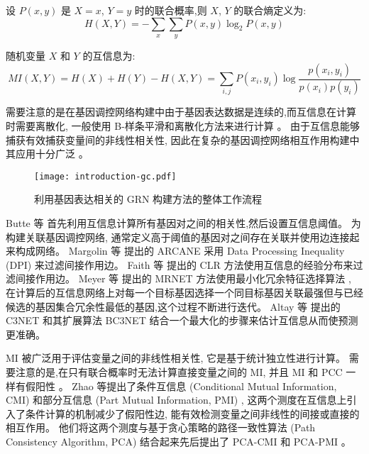 设 $P(x,y)$ 是 $X=x$, $Y=y$ 时的联合概率,则 $X$, $Y$ 的联合熵定义为:
\begin{equation}
    H(X,Y) =  - \sum\limits_x {\sum\limits_y {P(x,y)\log _2 P(x,y)} } 
\end{equation}

随机变量 $X$ 和 $Y$ 的互信息为:
\begin{equation}
    MI(X,Y) = H(X) + H(Y) - H(X,Y) = \sum\limits_{i,j} {P(x_i ,y_i )\log \frac{{p(x_i,y_i )}}{{p(x_i )p(y_i )}}} 
\end{equation}

需要注意的是在基因调控网络构建中由于基因表达数据是连续的,而互信息在计算时需要离散化,
一般使用 B-样条平滑和离散化方法来进行计算 。
由于互信息能够捕获有效捕获变量间的非线性相关性,
因此在复杂的基因调控网络相互作用构建中其应用十分广泛 。

\begin{figure}[!htbp]
    \centering
    \texttt{[image: introduction-gc.pdf]}
    \caption{
        利用基因表达相关的 GRN 构建方法的整体工作流程
    }
    \label{fig:pre-gc}
\end{figure}


Butte 等  首先利用互信息计算所有基因对之间的相关性,然后设置互信息阈值。
为构建关联基因调控网络, 通常定义高于阈值的基因对之间存在关联并使用边连接起来构成网络。
Margolin 等  提出的 ARCANE 采用 Data Processing Inequality (DPI) 来过滤间接作用边。
Faith 等  提出的 CLR 方法使用互信息的经验分布来过滤间接作用边。
Meyer 等  提出的 MRNET 方法使用最小化冗余特征选择算法 ,
在计算后的互信息网络上对每一个目标基因选择一个同目标基因关联最强但与已经候选的基因集合冗余性最低的基因,这个过程不断进行迭代。
Altay 等  提出的 C3NET 和其扩展算法 BC3NET  结合一个最大化的步骤来估计互信息从而使预测更准确。

MI 被广泛用于评估变量之间的非线性相关性,
它是基于统计独立性进行计算。
需要注意的是,在只有联合概率时无法计算直接变量之间的 MI,
并且 MI 和 PCC 一样有假阳性 。
Zhao 等提出了条件互信息 (Conditional Mutual Information, CMI)  和部分互信息 (Part Mutual Information, PMI) ,
这两个测度在互信息上引入了条件计算的机制减少了假阳性边,
能有效检测变量之间非线性的间接或直接的相互作用。
他们将这两个测度与基于贪心策略的路径一致性算法 (Path Consistency Algorithm, PCA) 结合起来先后提出了 PCA-CMI  和 PCA-PMI 。

